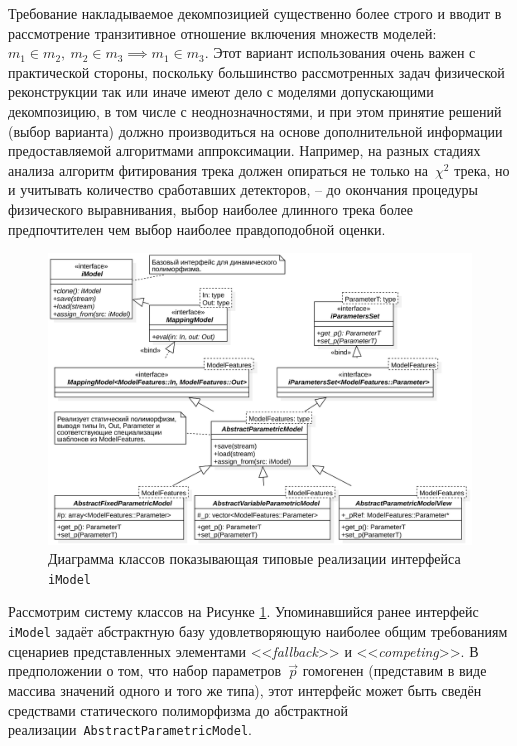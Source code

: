 Требование накладываемое декомпозицией существенно более строго и
вводит в рассмотрение транзитивное отношение включения
множеств моделей: $m_1 \in m_2, ~m_2 \in m_3 \implies m_1 \in m_3$. Этот вариант
использования очень важен с практической стороны, поскольку большинство
рассмотренных задач физической реконструкции так или иначе имеют
дело с моделями допускающими декомпозицию, в том числе с неоднозначностями,
и при этом принятие решений (выбор варианта) должно производиться на основе
дополнительной информации предоставляемой алгоритмами аппроксимации.
Например, на разных стадиях анализа алгоритм фитирования трека должен
опираться не только на~$\chi^2$ трека, но и учитывать количество сработавших
детекторов, -- до окончания процедуры физического выравнивания,
выбор наиболее длинного трека более предпочтителен чем выбор наиболее
правдоподобной оценки.

\begin{figure}
    \centering
    \includegraphics[width=1\linewidth]{images/umff-BasicModelClassDiagram-01.eps}
    \caption{Диаграмма классов показывающая типовые реализации интерфейса \texttt{iModel}}
    \label{fig:basic-model-classes}
\end{figure}

Рассмотрим систему классов на Рисунке \ref{fig:basic-model-classes}. Упоминавшийся ранее
интерфейс \texttt{iModel} задаёт абстрактную базу удовлетворяющую наиболее общим
требованиям сценариев представленных элементами <<\emph{fallback}>>
и <<\emph{competing}>>. В предположении о том, что набор параметров~$\vec{p}$
гомогенен (представим в виде массива значений одного и того же типа),
этот интерфейс может быть сведён средствами статического
полиморфизма до абстрактной реализации~\texttt{AbstractParametricModel}.


